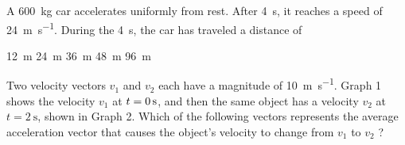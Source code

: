 \documentclass{../../../oss-ap12ibhl}
\begin{document}
\begin{questions}
  \uplevel{\rule{\linewidth}{.6pt}}
  
  \question A \SI{600}{\kilo\gram} car accelerates uniformly from rest. After
  \SI{4}{\second}, it reaches a speed of \SI{24}{\metre\per\second}. During
  the \SI{4}{\second}, the car has traveled a distance of

  \begin{oneparchoices}
    \choice\SI{12}{\metre}\hspace{.28in}
    \choice\SI{24}{\metre}\hspace{.28in}
    \choice\SI{36}{\metre}\hspace{.28in}
    \choice\SI{48}{\metre}\hspace{.28in}
    \choice\SI{96}{\metre}
  \end{oneparchoices}
  \newpage
  
  \question Two velocity vectors $v_1$ and $v_2$ each have a magnitude of
  \SI{10}{\metre\per\second}. Graph 1 shows the velocity $v_1$ at
  $t=\SI0{\second}$, and then the same object has a velocity $v_2$ at
  $t=\SI{2}{\second}$, shown in Graph 2. Which of the following vectors
  represents the average acceleration vector that causes the object's velocity
  to change from $v_1$ to $v_2$ ?
  \begin{center}
    \hspace{.2in}
  \end{center}
  \begin{oneparchoices}
    \choice
    \choice
    \choice

\end{oneparchoices}
\end{questions}
\end{document}
